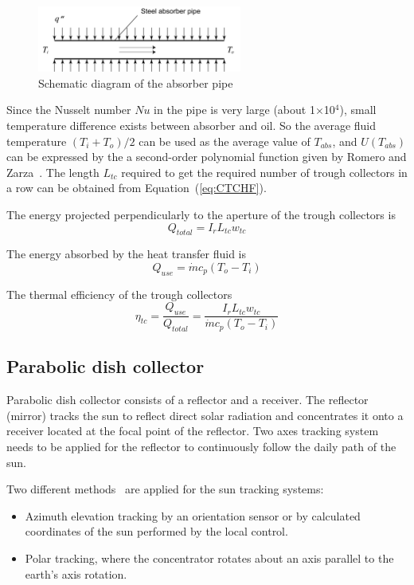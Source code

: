 \begin{figure}[!ht]
\centering
\includegraphics[width=0.6\textwidth]{fig/Pipe.pdf}
\caption{Schematic diagram of the absorber pipe}\label{fig:Pipe}
\end{figure}


Since the Nusselt number $Nu$ in the pipe is very large (about 1$\times$10$^4$), small temperature difference exists between absorber and oil. So the average fluid temperature $(T_{i}+T_{o})/2$ can be used as the average value of $T_{abs}$, and $U(T_{abs})$ can be expressed by the a second-order polynomial function given by Romero and Zarza~\cite{Romero2007}. The length $L_{tc}$ required to get the required number of trough collectors in a row can be obtained from Equation~(\ref{eq:CTCHF}).

The energy projected perpendicularly to the aperture of the trough collectors is
\begin{equation}
  Q_{total} = I_r L_{tc} w_{tc}
\end{equation}

The energy absorbed by the heat transfer fluid is 
\begin{equation}
  Q_{use} = \dot{m}c_p(T_o - T_i)
\end{equation}

The thermal efficiency of the trough collectors
\begin{equation}
  \eta_{tc} = \dfrac{Q_{use}}{Q_{total}} = 
  \dfrac{I_r L_{tc} w_{tc}}{\dot{m}c_p(T_o - T_i)}
  \label{eq:eta_tc}
\end{equation}

\subsection{Parabolic dish collector}
\label{sec:pdc}

Parabolic dish collector consists of a reflector and a receiver. The reflector (mirror) tracks the sun to reflect direct solar radiation and concentrates it onto a receiver located at the focal point of the reflector. Two axes tracking system needs to be applied for the reflector to continuously follow the daily path of the sun.

Two different methods~\cite{Adkins1987} are applied for the sun tracking systems:
\begin{itemize}
  \item Azimuth elevation tracking by an orientation sensor or by calculated coordinates of the sun performed by the local control.
  \item Polar tracking, where the concentrator rotates about an axis parallel to the earth’s axis rotation.
\end{itemize}

